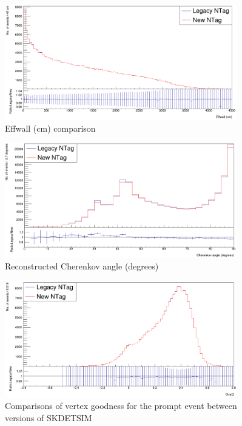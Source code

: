 \begin{figure}
    \centering
    \includegraphics[width=0.9\textwidth]{Figures/effwall_recon_compare.PNG}
    \caption{Effwall (cm) comparison}
    \label{fig:effwall_recon_compare}

\end{figure}

\begin{figure}
    \centering
    \includegraphics[width=0.9\textwidth]{Figures/angle_recon_compare.PNG}
    \caption{Reconstructed Cherenkov angle (degrees)}
    \label{fig:angle_recon_compare}

\end{figure}

\begin{figure}
    \centering
    \includegraphics[width=0.9\textwidth]{Figures/ovaq_recon_compare.PNG}
    \caption{Comparisons of vertex goodness for the prompt event between versions of SKDETSIM}
    \label{fig:ovaq_recon_compare}

\end{figure}

